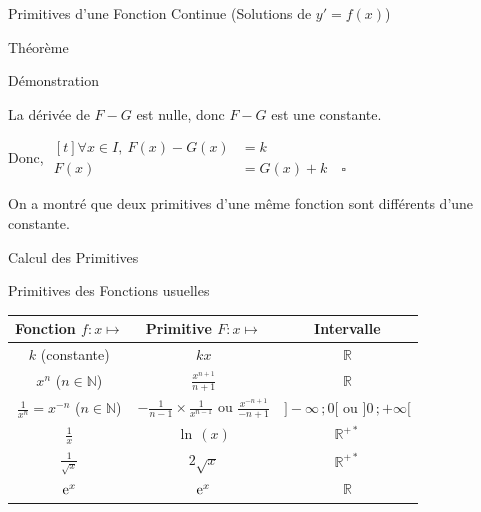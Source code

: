 \documentclass{coursbook}
\begin{document}
\begin{Gpartie}{Primitives d'une Fonction Continue \big(Solutions de $y'=f(x)$\big)}
\begin{Spartie}{Théorème}
\begin{SSpartie}{Démonstration}
\begin{enumerate}
                    La dérivée de $F-G$ est nulle, donc $F-G$ est une constante.
    
                    Donc, 
                    $\begin{aligned}[t]
                        \forall x\in I,\ F(x)-G(x)&=k \\
                        F(x)&=G(x)+k\quad\square
                    \end{aligned}$
    
                    On a montré que deux primitives d'une même fonction sont différents d'une constante.
                \end{enumerate}
            \end{SSpartie}
        \end{Spartie}
    \end{Gpartie}
    \begin{Gpartie}{Calcul des Primitives} 
        \vspace{-5ex}
        \begin{Spartie}{Primitives des Fonctions usuelles} 
            \begin{table}[H] \centering {}
                \begin{tabular}[c]{ @{}*{3}{C}@{} } \toprule
                    Fonction $f:x\mapsto$                       & Primitive $F:x\mapsto$                                            & Intervalle  \\ \midrule
                    $k$ (constante)                             & $kx$                                                              & $\mathbb{R}$ \\ 
                    $x^n$ ($n\in\mathbb{N}$)                    & $\frac{x^{n+1}}{n+1}$                                             & $\mathbb{R}$ \\ 
                    $\frac{1}{x^n}=x^{-n}$ ($n\in\mathbb{N}$)   & $-\frac{1}{n-1}\times\frac{1}{x^{n-1}}$ ou $\frac{x^{-n+1}}{-n+1}$& $\big]-\infty\,; 0\big[$ ou $\big]0\,; +\infty\big[$ \\ 
                    $\frac{1}{x}$                               & $\ln\,(x)$                                                          & $\mathbb{R^{+*}}$ \\ 
                    $\frac{1}{\sqrt{x}}$                        & $2\sqrt{x}$                                                       & $\mathbb{R^{+*}}$ \\ 
                    $\mathrm{e}^x$                                       & $\mathrm{e}^x$                                                             & $\mathbb{R}$ \\ 

\end{tabular}
\end{table}
\end{Spartie}
\end{Gpartie}
\end{document}

